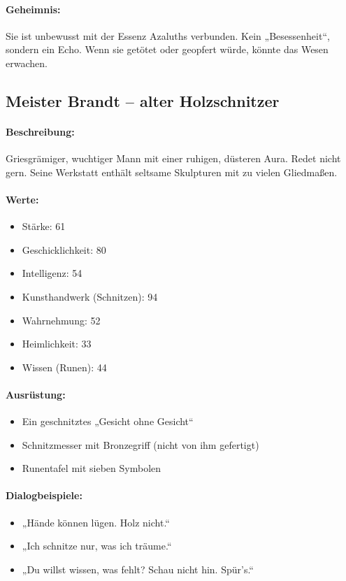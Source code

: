 \paragraph{Geheimnis:}
Sie ist unbewusst mit der Essenz Azaluths verbunden. Kein „Besessenheit“, sondern ein Echo. Wenn sie getötet oder geopfert würde, könnte das Wesen erwachen.
\newpage
\subsection{Meister Brandt – alter Holzschnitzer}
\paragraph{Beschreibung:}
Griesgrämiger, wuchtiger Mann mit einer ruhigen, düsteren Aura. Redet nicht gern. Seine Werkstatt enthält seltsame Skulpturen mit zu vielen Gliedmaßen.
\paragraph{Werte:}
\begin{itemize}
\item Stärke: 61
\item Geschicklichkeit: 80
\item Intelligenz: 54
\item Kunsthandwerk (Schnitzen): 94
\item Wahrnehmung: 52
\item Heimlichkeit: 33
\item Wissen (Runen): 44
\end{itemize}
\paragraph{Ausrüstung:}
\begin{itemize}
\item Ein geschnitztes „Gesicht ohne Gesicht“
\item Schnitzmesser mit Bronzegriff (nicht von ihm gefertigt)
\item Runentafel mit sieben Symbolen
\end{itemize}
\paragraph{Dialogbeispiele:}
\begin{itemize}
\item „Hände können lügen. Holz nicht.“
\item „Ich schnitze nur, was ich träume.“
\item „Du willst wissen, was fehlt? Schau nicht hin. Spür’s.“
\end{itemize}
